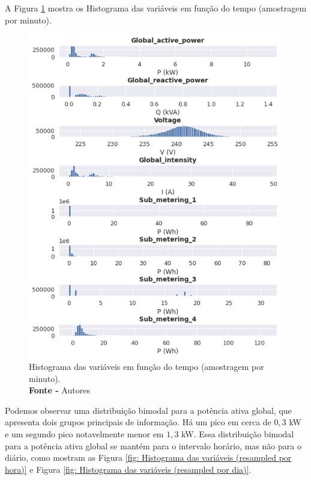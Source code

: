 A Figura \ref{fig: Histograma das variáveis em função do tempo (amostragem por minuto)} mostra os Histograma das variáveis em função do tempo (amostragem por minuto).
\begin{figure}[H]
    \centering
    \includegraphics[width=0.99\textwidth]{Figuras/4. Resultados e Discussões/Exer4/Histograma das variáveis em função do tempo (amostragem por minuto).jpg}
    \caption{Histograma das variáveis em função do tempo (amostragem por minuto).\\ \textbf{Fonte -} Autores}
    \label{fig: Histograma das variáveis em função do tempo (amostragem por minuto)}
\end{figure}

Podemos observar uma distribuição bimodal para a potência ativa global, que apresenta dois grupos principais de informação. Há um pico em cerca de $0,3$ kW e um segundo pico notavelmente menor em $1,3$ kW.
Essa distribuição bimodal para a potência ativa global se mantém para o intervalo horário, mas não para o diário, como mostram as Figura \ref{fig: Histograma das variáveis (resampled por hora)} e Figura \ref{fig: Histograma das variáveis (resampled por dia)}.

